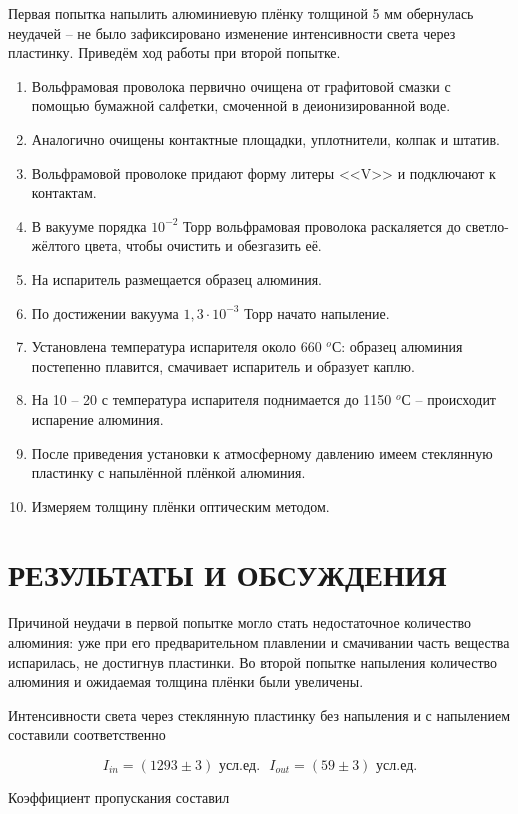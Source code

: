 \documentclass[a4paper, 14pt]{extarticle}
\begin{document}
	Первая попытка напылить алюминиевую плёнку толщиной 5 мм обернулась неудачей -- не было зафиксировано изменение интенсивности света через пластинку. Приведём ход работы при второй попытке. 
	
	\begin{enumerate}
		\item Вольфрамовая проволока первично очищена от графитовой смазки с помощью бумажной салфетки, смоченной в деионизированной воде.
		\item Аналогично очищены контактные площадки, уплотнители, колпак и штатив.
		\item Вольфрамовой проволоке придают форму литеры <<V>> и подключают к контактам. 
		\item В вакууме порядка $10^{-2}$ Торр вольфрамовая проволока раскаляется до светло-жёлтого цвета, чтобы очистить и обезгазить её.
		\item На испаритель размещается образец алюминия.
		\item По достижении вакуума $1,3 \cdot 10^{-3}$ Торр начато напыление.
		\item Установлена температура испарителя около 660 $^o$С: образец алюминия постепенно плавится, смачивает испаритель и образует каплю.
		\item На 10 -- 20 с температура испарителя поднимается до 1150 $^o$С -- происходит испарение алюминия.
		\item После приведения установки к атмосферному давлению имеем стеклянную пластинку с напылённой плёнкой алюминия.
		\item Измеряем толщину плёнки оптическим методом.
	\end{enumerate} 
	
	\section{РЕЗУЛЬТАТЫ И ОБСУЖДЕНИЯ}
	
	Причиной неудачи в первой попытке могло стать недостаточное количество алюминия: уже при его предварительном плавлении и смачивании часть вещества испарилась, не достигнув пластинки. Во второй попытке напыления количество алюминия и ожидаемая толщина плёнки были увеличены. 
	
	Интенсивности света через стеклянную пластинку без напыления и с напылением составили соответственно
	
	\[ I_{in} = (1293 \pm 3) \text{ усл.ед.} \ \ \ I_{out} = (59 \pm 3) \text{ усл.ед.} \]
	
	Коэффициент пропускания составил
	
\end{document}
